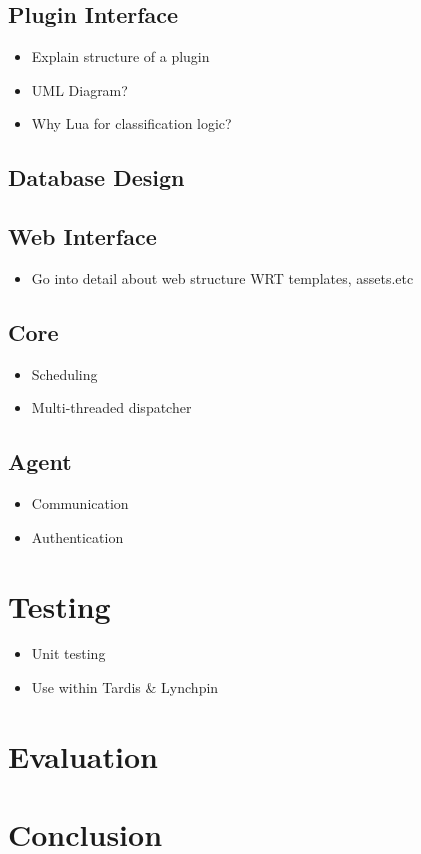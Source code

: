 \documentclass[bsc,logo,twoside]{infthesis}
\begin{document}
\section{Plugin Interface}
\begin{itemize}
	\item Explain structure of a plugin
	\item UML Diagram?
	\item Why Lua for classification logic?
\end{itemize}

\section{Database Design}

\section{Web Interface}
\begin{itemize}
	\item Go into detail about web structure WRT templates, assets.etc
\end{itemize}

\section{Core}
\begin{itemize}
	\item Scheduling
	\item Multi-threaded dispatcher
\end{itemize}

\section{Agent}
\begin{itemize}
	\item Communication
	\item Authentication
\end{itemize}

\chapter{Testing}
\begin{itemize}
	\item Unit testing
	\item Use within Tardis \& Lynchpin
\end{itemize}
	
\chapter{Evaluation}

\chapter{Conclusion}
\end{document}
